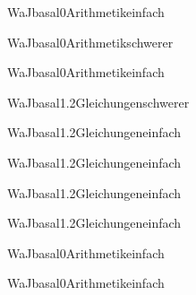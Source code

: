 \documentclass[12pt]{article}
\begin{document}
\begin{Add}{WaJ}{basal0}{Arithmetik}{einfach}
\end{Add}

\begin{Add}{WaJ}{basal0}{Arithmetik}{schwerer}
\end{Add}

\begin{Add}{WaJ}{basal0}{Arithmetik}{einfach}
\end{Add}

\begin{Add}{WaJ}{basal1.2}{Gleichungen}{schwerer}
\end{Add}

\begin{Add}{WaJ}{basal1.2}{Gleichungen}{einfach}
\end{Add}

\begin{Add}{WaJ}{basal1.2}{Gleichungen}{einfach}
\end{Add}

\begin{Add}{WaJ}{basal1.2}{Gleichungen}{einfach}
\end{Add}

\begin{Add}{WaJ}{basal1.2}{Gleichungen}{einfach}
\end{Add}

\begin{Add}{WaJ}{basal0}{Arithmetik}{einfach}
\end{Add}

\begin{Add}{WaJ}{basal0}{Arithmetik}{einfach}
\end{Add}
\end{document}
